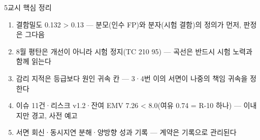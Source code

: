 \begin{frame}{5교시 핵심 정리}
\begin{enumerate}
\item 결함밀도 0.132 > 0.13 — 분모(인수 FP)와 분자(시험 결함)의 정의가 먼저, 판정은 그다음
\item 8월 평탄은 개선이 아니라 시험 정지(TC 210 \ra{} 95) — 곡선은 반드시 시험 노력과 함께 읽는다
\item 감리 지적은 등급보다 원인 귀속 칸 — 3·4번 이의 서면이 나중의 책임 귀속을 정한다
\item 이슈 11건·리스크 v1.2·잔여 EMV 7.26 < 8.0(여유 0.74 = R-10 하나) — 이내지만 경고, 사전 예고
\item 서면 회신·동시지연 분해·양방향 성과 기록 — 계약은 기록으로 관리된다
\end{enumerate}
\end{frame}
